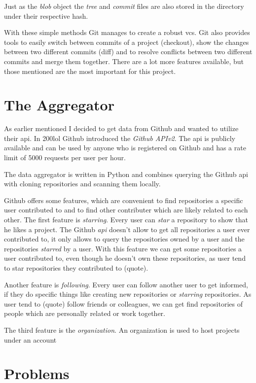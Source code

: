 Just as the \emph{blob} object the \emph{tree} and \emph{commit} files are also stored in the  directory under their respective hash.

With these simple methods Git manages to create a robust \ac{vcs}.
Git also provides tools to easily switch between commits of a project (checkout), show the changes between two different commits (diff) and to resolve conflicts between two different commits and merge them together.
There are a lot more features available, but those mentioned are the most important for this project.

\section{The Aggregator}

As earlier mentioned I decided to get data from Github and wanted to utilize their \ac{api}. In 200lol Github introduced the \emph{Github APIv2}.
The \ac{api} is publicly available and can be used by anyone who is registered on Github and has a rate limit of 5000 requests per user per hour.

The data aggregator is written in Python and combines querying the Github \ac{api} with cloning repositories and scanning them locally.

Github offers some features, which are convenient to find repositories a specific user contributed to and to find other contributer which are likely related to each other.
The first feature is \emph{starring}. Every user can \emph{star} a repository to show that he likes a project.
The Github \emph{api} doesn't allow to get all repositories a user ever contributed to, it only allows to query the repositories owned by a user and the repositories \emph{starred} by a user.
With this feature we can get some repositories a user contributed to, even though he doesn't own these repositories, as user tend to star repositories they contributed to (quote).

Another feature is \emph{following}. Every user can follow another user to get informed, if they do specific things like creating new repositories or \emph{starring} repositories. As user tend to (quote) follow friends or colleagues, we can get find repositories of people which are personally related or work together.

The third feature is the \emph{organization}. An organization is used to host projects under an account

\section{Problems}

